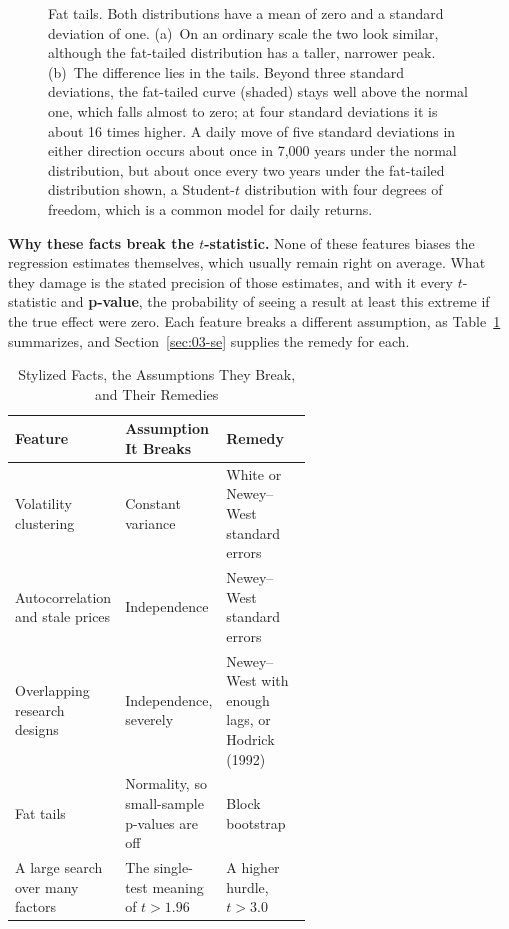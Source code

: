 \begin{figure}[!htbp]
  \caption{Fat tails. Both distributions have a mean of zero and a standard deviation of one. (a)~On an ordinary scale the two look similar, although the fat-tailed distribution has a taller, narrower peak. (b)~The difference lies in the tails. Beyond three standard deviations, the fat-tailed curve (shaded) stays well above the normal one, which falls almost to zero; at four standard deviations it is about 16 times higher. A daily move of five standard deviations in either direction occurs about once in 7,000 years under the normal distribution, but about once every two years under the fat-tailed distribution shown, a Student-$t$ distribution with four degrees of freedom, which is a common model for daily returns.}
  \label{fig:03-tails}
\end{figure}

\textbf{Why these facts break the $t$-statistic.} None of these features biases the regression estimates themselves, which usually remain right on average. What they damage is the stated precision of those estimates, and with it every $t$-statistic and \textbf{p-value}, the probability of seeing a result at least this extreme if the true effect were zero. Each feature breaks a different assumption, as Table~\ref{tab:03-facts-remedies} summarizes, and Section~\ref{sec:03-se} supplies the remedy for each.

\begin{table}[htbp]
\centering
\small
\caption{Stylized Facts, the Assumptions They Break, and Their Remedies}
\label{tab:03-facts-remedies}
\begin{tabularx}{0.95\linewidth}{@{}>{\raggedright\arraybackslash}p{0.26\linewidth}>{\raggedright\arraybackslash}X>{\raggedright\arraybackslash}p{0.33\linewidth}@{}}
\toprule
Feature & Assumption It Breaks & Remedy \\
\midrule
Volatility clustering & Constant variance & White or Newey--West standard errors \\
Autocorrelation and stale prices & Independence & Newey--West standard errors \\
Overlapping research designs & Independence, severely & Newey--West with enough lags, or Hodrick (1992) \\
Fat tails & Normality, so small-sample p-values are off & Block bootstrap \\
A large search over many factors & The single-test meaning of $t > 1.96$ & A higher hurdle, $t > 3.0$ \\
\bottomrule
\end{tabularx}
\end{table}

